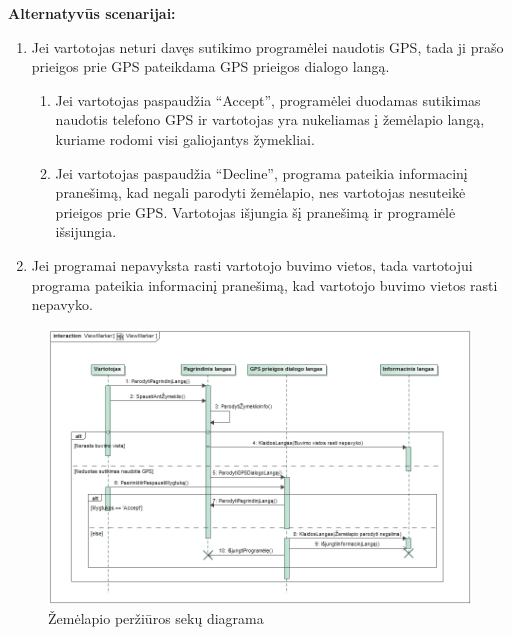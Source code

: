 \documentclass{VUMIFPSkursinis}
\begin{document}
	\textbf{Alternatyvūs scenarijai:}
	\begin{enumerate}[itemsep=-2mm]
		\item Jei vartotojas neturi davęs sutikimo programėlei naudotis GPS, tada ji prašo prieigos prie GPS pateikdama GPS prieigos dialogo langą. 
		\begin{enumerate}[itemsep=-2mm]
			\item Jei vartotojas paspaudžia “Accept”, programėlei duodamas sutikimas naudotis telefono GPS ir vartotojas yra nukeliamas į žemėlapio langą, kuriame rodomi visi galiojantys žymekliai.
			\item Jei vartotojas paspaudžia “Decline”, programa pateikia informacinį pranešimą, kad negali parodyti žemėlapio, nes vartotojas nesuteikė prieigos prie GPS. Vartotojas išjungia šį pranešimą ir programėlė išsijungia.
		\end{enumerate} 
		\item Jei programai nepavyksta rasti vartotojo buvimo vietos, tada vartotojui programa pateikia informacinį pranešimą, kad vartotojo buvimo vietos rasti nepavyko.
	\end{enumerate} 
		\begin{figure}[H]
				\centering
				\includegraphics[scale=0.5]{img/ViewMarkerSequence}
				\caption{Žemėlapio peržiūros sekų diagrama}
				\label{img:Žemėlapio redagavimas. Žymeklių peržiūra}
			\end{figure}
\end{document}
